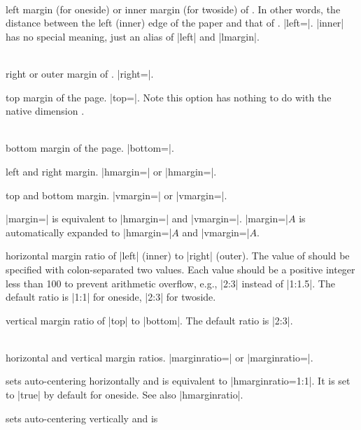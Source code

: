\begin{Options}
\item[left\OR lmargin\OR inner]~\\
   left margin (for oneside) or inner margin (for twoside) of 
   . In other words, the distance between the left (inner)
   edge of the paper and that of . |left=|.
   |inner| has no special meaning, just an alias of |left| and |lmargin|.
\item[right\OR rmargin\OR outer]~\\ 
   right or outer margin of . |right=|.
\item[top\OR tmargin] top margin of the page. |top=|.
   Note this option has nothing to do with the native dimension
   .
\item[bottom\OR bmargin]~\\ 
   bottom margin of the page. |bottom=|.
\item[hmargin] left and right margin.
  |hmargin=| or |hmargin=|.
\item[vmargin] top and bottom margin.
  |vmargin=| or |vmargin=|.
\item[margin] |margin=| is equivalent to 
  |hmargin=| and |vmargin=|.
  |margin=|$A$ is automatically expanded to |hmargin=|$A$ and |vmargin=|$A$.
\item[hmarginratio]
  horizontal margin ratio of |left| (inner) to |right| (outer). 
  The value of  should be specified with colon-separated 
  two values. Each value should be a positive integer less than 100
  to prevent arithmetic overflow, e.g., |2:3| instead of |1:1.5|.
  The default ratio is |1:1| for oneside, |2:3| for twoside.
\item[vmarginratio]
   vertical margin ratio of |top| to |bottom|. The default ratio is |2:3|.
\item[marginratio\OR ratio]~\\
   horizontal and vertical margin ratios.
  |marginratio=| or
  |marginratio=|.
\item[hcentering] sets auto-centering horizontally and is
  equivalent to |hmarginratio=1:1|. It is set to |true| by default for
  oneside. See also |hmarginratio|.
\item[vcentering] sets auto-centering vertically and is

\end{Options}
